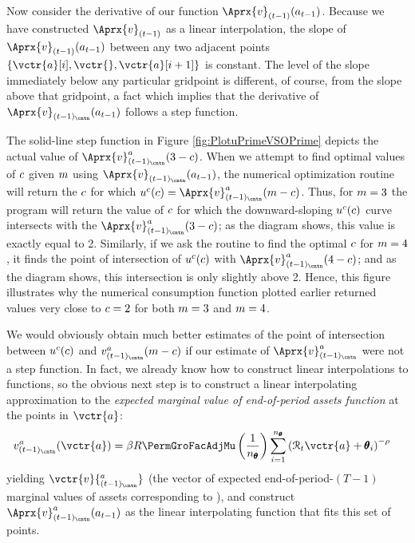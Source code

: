 Now consider the derivative of our function $\Aprx{\vFunc}_{({\prdT-1})}({a}_{\prdT-1})$.  Because we have
constructed $\Aprx{\vFunc}_{({\prdT-1})}$ as a linear interpolation, the slope of
$\Aprx{\vFunc}_{({\prdT-1})}({a}_{\prdT-1})$ between any two adjacent points
$\{\vctr{a}[i],\vctr{},\vctr{a}[{i+1}]\}$ is constant.  The level of the slope immediately below any
particular gridpoint is different, of course, from the slope above that gridpoint, a fact which
implies that the derivative of $\Aprx{\vFunc}_{({\prdT-1})_\cntn}({a}_{\prdT-1})$ follows a step function.

The solid-line step function in Figure \ref{fig:PlotuPrimeVSOPrime} depicts the actual value of
$\Aprx{\vFunc}_{({\prdT-1})_\cntn}^{{a}}(3-\cNrm)$.  When we attempt to find optimal values of
$c$ given $m$ using $\Aprx{\vFunc}_{({\prdT-1})_\cntn}({a}_{\prdT-1})$, the numerical optimization routine will
return the $c$ for which
$\uFunc^{{c}}(\cNrm) = \Aprx{\vFunc}^{{a}}_{({\prdT-1})_\cntn}(\mNrm-\cNrm)$.  Thus, for
$m=3$ the program will return the value of $c$ for which the downward-sloping
$u^{{c}}(c)$ curve intersects with the
$\Aprx{\vFunc}_{({\prdT-1})_\cntn}^{{a}}(3-\cNrm)$; as the diagram shows, this value is exactly equal to 2.
Similarly, if we ask the routine to find the optimal $c$ for $m=4$, it finds the point of
intersection of $u^{{c}}(c)$ with $\Aprx{\vFunc}_{({\prdT-1})_\cntn}^{{a}}(4-\cNrm)$; and as the diagram shows, this
intersection is only slightly above 2.  Hence, this figure illustrates why the numerical consumption
function plotted earlier returned values very close to $c=2$ for both $m=3$ and $m=4$.

We would obviously obtain much better estimates of the point of intersection between $u^{{c}}(c)$ and $\vFunc_{({\prdT-1})_\cntn}^{{a}}(\mNrm-\cNrm)$ if our estimate of $\Aprx{\vFunc}^{{a}}_{({\prdT-1})_\cntn}$ were not a step function.  In fact, we already know how to construct linear interpolations to functions, so the obvious next step is to construct a linear interpolating approximation to the \textit{expected marginal value of end-of-period assets function} at the points in $\vctr{a}$:
\begin{equation}\begin{gathered}\begin{aligned}
      \vFunc_{({\prdT-1})_\cntn}^{{a}}(\vctr{a})  & =  \DiscFac \Rfree \PermGroFacAdjMu \left(\frac{1}{n_{\TranShkEmp}}\right) \sum_{i=1}^{n_{\TranShkEmp}} \left(\RNrm_{\prdT} \vctr{a} + \TranShkEmp_{i}\right)^{-\CRRA} \label{eq:vEndPrimeTm1}
    \end{aligned}\end{gathered}\end{equation}
yielding $\vctr{{v}}{^{a}_{({\prdT-1})_\cntn}}$ (the vector of expected end-of-period-$(T-1)$ marginal values of assets corresponding to ),  %
and construct
$\Aprx{\vFunc}_{({\prdT-1})_\cntn}^{{a}}({a}_{\prdT-1})$ as the linear
interpolating function that fits this set of points.

